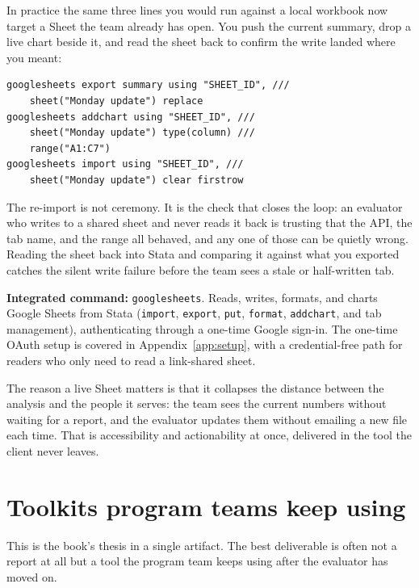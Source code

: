 \documentclass[
    a4paper,
    fontsize=10pt,
    twoside=true,
    numbers=noenddot,
]{kaobook}
\begin{document}
In practice the same three lines you would run against a local workbook now target a Sheet the team already has open. You push the current summary, drop a live chart beside it, and read the sheet back to confirm the write landed where you meant:
{\footnotesize
\begin{verbatim}
googlesheets export summary using "SHEET_ID", ///
    sheet("Monday update") replace
googlesheets addchart using "SHEET_ID", ///
    sheet("Monday update") type(column) ///
    range("A1:C7")
googlesheets import using "SHEET_ID", ///
    sheet("Monday update") clear firstrow
\end{verbatim}
}
The re-import is not ceremony. It is the check that closes the loop: an evaluator who writes to a shared sheet and never reads it back is trusting that the API, the tab name, and the range all behaved, and any one of those can be quietly wrong. Reading the sheet back into Stata and comparing it against what you exported catches the silent write failure before the team sees a stale or half-written tab.

\begin{kaobox}[frametitle=Package Integration: \texttt{googlesheets}]
\textbf{Integrated command:} \texttt{googlesheets}. Reads, writes, formats, and charts Google Sheets from Stata (\texttt{import}, \texttt{export}, \texttt{put}, \texttt{format}, \texttt{addchart}, and tab management), authenticating through a one-time Google sign-in. The one-time OAuth setup is covered in Appendix~\ref{app:setup}, with a credential-free path for readers who only need to read a link-shared sheet.
\end{kaobox}

The reason a live Sheet matters is that it collapses the distance between the analysis and the people it serves: the team sees the current numbers without waiting for a report, and the evaluator updates them without emailing a new file each time. That is accessibility and actionability at once, delivered in the tool the client never leaves.

\section{Toolkits program teams keep using}\label{sec:teamtoolkit}
This is the book's thesis in a single artifact. The best deliverable is often not a report at all but a tool the program team keeps using after the evaluator has moved on.
\end{document}
